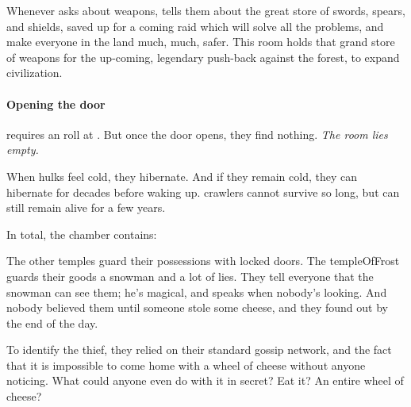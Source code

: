 \begin{multicols}{2}

\begin{exampletext}
  Whenever  asks about \glspl{weapon},  tells them about the great store of swords, spears, and shields, saved up for a coming raid which will solve all the problems, and make everyone in the land much, much, safer.
  This room holds that grand store of weapons for the up-coming, legendary push-back against the forest, to expand civilization.
\end{exampletext}

\paragraph{Opening the door}
requires an  roll at \tn[12].
But once the door opens, they find nothing.
\emph{The room lies empty.}


When \glspl{hulk} feel cold, they hibernate.
And if they remain cold, they can hibernate for decades before waking up.
\Glspl{crawler} cannot survive so long, but can still remain alive for a few years.

In total, the chamber contains:

\chitincrawler

\chitincrawler



\basilisk

\dragon

\showStdSpells



\begin{exampletext}
  The other \glspl{temple} guard their possessions with locked doors.
  The \gls{templeOfFrost} guards their goods a snowman and a lot of lies.
  They tell everyone that the snowman can see them; he's magical, and speaks when nobody's looking.
  And nobody believed them until someone stole some cheese, and they found out by the end of the day.

  To identify the thief, they relied on their standard gossip network, and the fact that it is impossible to come home with a wheel of cheese without anyone noticing.
  What could anyone even do with it in secret?
  Eat it?
  An entire wheel of cheese?
\end{exampletext}


\end{multicols}
